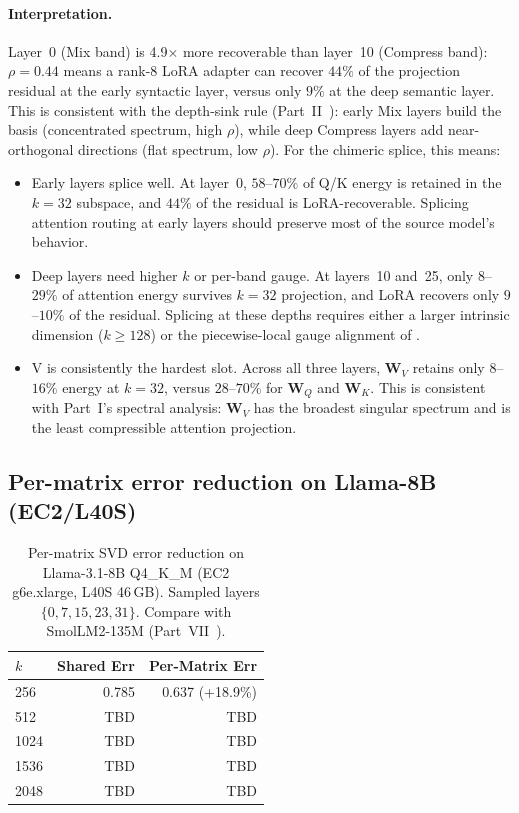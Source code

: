 \documentclass[11pt]{article}
\providecommand{\Wmat}{\mathbf{W}}
\begin{document}
\paragraph{Interpretation.} Layer~0 (Mix band) is 4.9$\times$
more recoverable than layer~10 (Compress band): $\rho{=}0.44$ means
a rank-8 LoRA adapter can recover $44\%$ of the projection residual
at the early syntactic layer, versus only $9\%$ at the deep semantic
layer. This is consistent with the depth-sink rule
(Part~II~\cite{stewart2026gp}): early Mix layers build the basis
(concentrated spectrum, high $\rho$), while deep Compress layers add
near-orthogonal directions (flat spectrum, low $\rho$). For the
chimeric splice, this means:

\begin{itemize}
\item Early layers splice well. At layer~0, $58$--$70\%$
 of Q/K energy is retained in the $k{=}32$ subspace, and
 $44\%$ of the residual is LoRA-recoverable. Splicing
 attention routing at early layers should preserve most
 of the source model's behavior.

\item Deep layers need higher $k$ or per-band gauge.
 At layers~10 and~25, only $8$--$29\%$ of attention energy
 survives $k{=}32$ projection, and LoRA recovers only
 $9$--$10\%$ of the residual. Splicing at these depths
 requires either a larger intrinsic dimension ($k{\ge}128$)
 or the piecewise-local gauge alignment of
 .

\item V is consistently the hardest slot. Across all
 three layers, $\Wmat_V$ retains only $8$--$16\%$ energy at
 $k{=}32$, versus $28$--$70\%$ for $\Wmat_Q$ and $\Wmat_K$.
 This is consistent with Part~I's spectral analysis: $\Wmat_V$
 has the broadest singular spectrum and is the least
 compressible attention projection.
\end{itemize}

\subsection{Per-matrix error reduction on Llama-8B (EC2/L40S)}

\begin{table}[h]\centering\small
\caption{Per-matrix SVD error reduction on Llama-3.1-8B Q4\_K\_M
(EC2 g6e.xlarge, L40S 46\,GB). Sampled layers $\{0,7,15,23,31\}$.
Compare with SmolLM2-135M (Part~VII~\cite{stewart2026ffn}).}
\label{tab:per-matrix-llama8b}
\begin{tabular}{@{}lrr@{}}
\toprule
$k$ & Shared Err & Per-Matrix Err \\
\midrule
256 & 0.785 & 0.637 (+18.9\%) \\
512 & TBD & TBD \\
1024 & TBD & TBD \\
1536 & TBD & TBD \\
2048 & TBD & TBD \\
\bottomrule
\end{tabular}
\end{table}
\end{document}

